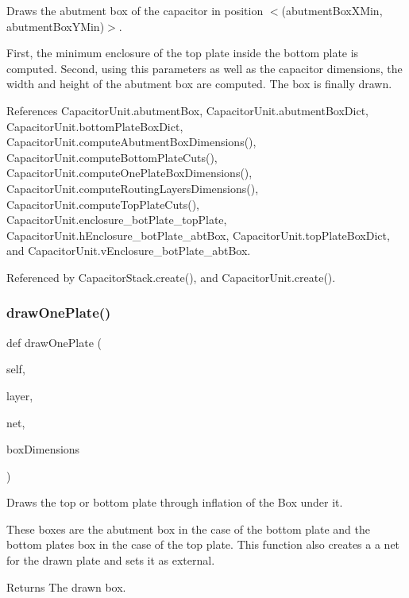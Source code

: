 Draws the abutment box of the capacitor in position {\ttfamily $<$}(abutment\+Box\+X\+Min, abutment\+Box\+Y\+Min)$>$. 

First, the minimum enclosure of the top plate inside the bottom plate is computed. Second, using this parameters as well as the capacitor dimensions, the width and height of the abutment box are computed. The box is finally drawn. 

References Capacitor\+Unit.\+abutment\+Box, Capacitor\+Unit.\+abutment\+Box\+Dict, Capacitor\+Unit.\+bottom\+Plate\+Box\+Dict, Capacitor\+Unit.\+compute\+Abutment\+Box\+Dimensions(), Capacitor\+Unit.\+compute\+Bottom\+Plate\+Cuts(), Capacitor\+Unit.\+compute\+One\+Plate\+Box\+Dimensions(), Capacitor\+Unit.\+compute\+Routing\+Layers\+Dimensions(), Capacitor\+Unit.\+compute\+Top\+Plate\+Cuts(), Capacitor\+Unit.\+enclosure\+\_\+bot\+Plate\+\_\+top\+Plate, Capacitor\+Unit.\+h\+Enclosure\+\_\+bot\+Plate\+\_\+abt\+Box, Capacitor\+Unit.\+top\+Plate\+Box\+Dict, and Capacitor\+Unit.\+v\+Enclosure\+\_\+bot\+Plate\+\_\+abt\+Box.



Referenced by Capacitor\+Stack.\+create(), and Capacitor\+Unit.\+create().

\mbox{\label{classpython_1_1capacitorunit_1_1CapacitorUnit_a2b2756aa53569e2b59504ae6a7286653}} 
\subsubsection{\texorpdfstring{draw\+One\+Plate()}{drawOnePlate()}}
{\footnotesize\ttfamily def draw\+One\+Plate (\begin{DoxyParamCaption}\item[{}]{self,  }\item[{}]{layer,  }\item[{}]{net,  }\item[{}]{box\+Dimensions }\end{DoxyParamCaption})}



Draws the top or bottom plate through inflation of the Box under it. 

These boxes are the abutment box in the case of the bottom plate and the bottom plate\textquotesingle{}s box in the case of the top plate. This function also creates a a net for the drawn plate and sets it as external. \begin{DoxyReturn}{Returns}
The drawn box. 
\end{DoxyReturn}


